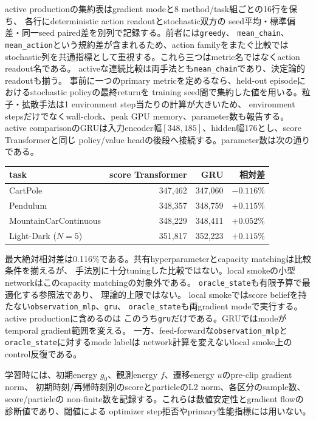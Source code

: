 \documentclass[a4paper,11pt]{article}
\begin{document}
active productionの集約表はgradient modeと8 method/task組ごとの16行を保ち、
各行にdeterministic action readoutとstochastic双方の
seed平均・標準偏差・同一seed paired差を別列で記録する。前者には\texttt{greedy}、
\texttt{mean\_chain}、\texttt{mean\_action}という規約差が含まれるため、action familyをまたぐ比較では
stochastic列を共通指標として重視する。これら三つはmetric名ではなくaction readout名である。
activeな連続比較は両手法とも\texttt{mean\_chain}であり、決定論的readoutも揃う。
事前に一つのprimary metricを定めるなら、held-out episodeにおけるstochastic policyの最終returnを
training seed間で集約した値を用いる。粒子・拡散手法は1 environment step当たりの計算が大きいため、
environment stepsだけでなくwall-clock、peak GPU memory、parameter数も報告する。
active comparisonのGRUは入力encoder幅$[348,185]$、hidden幅176とし、score Transformerと同じ
policy/value headの後段へ接続する。parameter数は次の通りである。
\begin{center}
\small
\begin{tabular}{lrrr}
\hline
task & score Transformer & GRU & 相対差 \\
\hline
CartPole & 347,462 & 347,060 & $-0.116\%$ \\
Pendulum & 348,357 & 348,759 & $+0.115\%$ \\
MountainCarContinuous & 348,229 & 348,411 & $+0.052\%$ \\
Light-Dark ($N=5$) & 351,817 & 352,223 & $+0.115\%$ \\
\hline
\end{tabular}
\end{center}
最大絶対相対差は0.116\%である。共有hyperparameterとcapacity matchingは比較条件を揃えるが、
手法別に十分tuningした比較ではない。local smokeの小型networkはこのcapacity matchingの対象外である。
\texttt{oracle\_state}も有限予算で最適化する参照法であり、
理論的上限ではない。
local smokeではscore beliefを持たない\texttt{observation\_mlp}、\texttt{gru}、
\texttt{oracle\_state}も両gradient modeで実行する。active productionに含めるのは
このうち\texttt{gru}だけである。GRUではmodeがtemporal gradient範囲を変える。
一方、feed-forwardな\texttt{observation\_mlp}と\texttt{oracle\_state}に対するmode labelは
network計算を変えないlocal smoke上のcontrol反復である。

学習時には、初期energy $g_0$、観測energy $f$、遷移energy $u$のpre-clip gradient norm、
初期時刻/再帰時刻別のscoreとparticleのL2 norm、各区分のsample数、score/particleの
non-finite数を記録する。これらは数値安定性とgradient flowの診断値であり、閾値による
optimizer step拒否やprimary性能指標には用いない。
\end{document}
